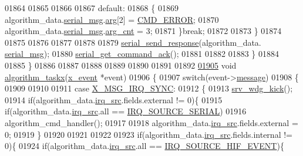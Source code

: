 \begin{DoxyCode}
{{{{{01864                 
01865 
01866 
01867                 \textcolor{keywordflow}{default}:
01868             \{
01869                      algorithm\_data.\hyperlink{a00016_afcf5f557aea688aad985eec15269c1da}{serial\_msg}.\hyperlink{a00031_af7d6f762438c80072bd9dc0e4dd4ae1e}{arg}[2]               = 
      \hyperlink{a00021_a1764a522e9c1a59a59be8757c69fa494}{CMD\_ERROR};
01870                          algorithm\_data.\hyperlink{a00016_afcf5f557aea688aad985eec15269c1da}{serial\_msg}.\hyperlink{a00031_a7b79f40e2eeec288091afd340bf8f591}{arg\_cnt}              = 3;
01871                 \}\textcolor{keywordflow}{break};
01872 
01873         \}
01874         
01875 
01876 
01877 
01878 
01879                \hyperlink{a00031_a96a3f016ca5b0736424c2695fe9fbdf8}{serial\_send\_response}(algorithm\_data.
      \hyperlink{a00016_afcf5f557aea688aad985eec15269c1da}{serial\_msg});
01880                \hyperlink{a00031_a7fc7421ed15d6e4516e9878e7455d715}{serial\_get\_command\_ack}();
01881 
01882 
01883      \}
01884  
01885 \}
01886 
01887 
01888 
01889 
01890 
01891 
01892 
\hypertarget{a00038_source_l01905}{}\hyperlink{a00038_a1d182ae18a9176c2a1e28cc654dc0e43}{01905} \textcolor{keywordtype}{void} \hyperlink{a00038_a1d182ae18a9176c2a1e28cc654dc0e43}{algorithm\_taskx}(\hyperlink{a00036_de/d37/a00849}{x\_event} *event)
01906 \{
01907     \textcolor{keywordflow}{switch}(event->\hyperlink{a00036_adf9665938515a20c283eea2c978cf80d}{message})
01908     \{
01909 
01910 
01911         \textcolor{keywordflow}{case} \hyperlink{a00036_a104f1137aafb33160da80932fe63c40d}{X\_MSG\_IRQ\_SYNC}:
01912         \{
01913              \hyperlink{a00067_a710d148845397582739d170341f3d3d9}{srv\_wdg\_kick}();
01914             \textcolor{keywordflow}{if}(algorithm\_data.\hyperlink{a00016_a1aafd556b3c9ed3e5295b17dbd80cab8}{irq\_src}.fields.external != 0)\{
01915                     \textcolor{keywordflow}{if}(algorithm\_data.\hyperlink{a00016_a1aafd556b3c9ed3e5295b17dbd80cab8}{irq\_src}.all == \hyperlink{a00021_a286de80383de54438b3e38d9f149dfd0}{IRQ\_SOURCE\_SERIAL})
01916                     algorithm\_cmd\_handler();
01917 
01918                   algorithm\_data.\hyperlink{a00016_a1aafd556b3c9ed3e5295b17dbd80cab8}{irq\_src}.fields.external = 0;
01919             \}
01920 
01921 
01922 
01923             \textcolor{keywordflow}{if}(algorithm\_data.\hyperlink{a00016_a1aafd556b3c9ed3e5295b17dbd80cab8}{irq\_src}.fields.internal != 0)\{
01924                     \textcolor{keywordflow}{if}(algorithm\_data.\hyperlink{a00016_a1aafd556b3c9ed3e5295b17dbd80cab8}{irq\_src}.all == \hyperlink{a00021_a51725fc3a4c26625f15db1274791d961}{IRQ\_SOURCE\_HIF\_EVENT})\{
}}}}}
\end{DoxyCode}
